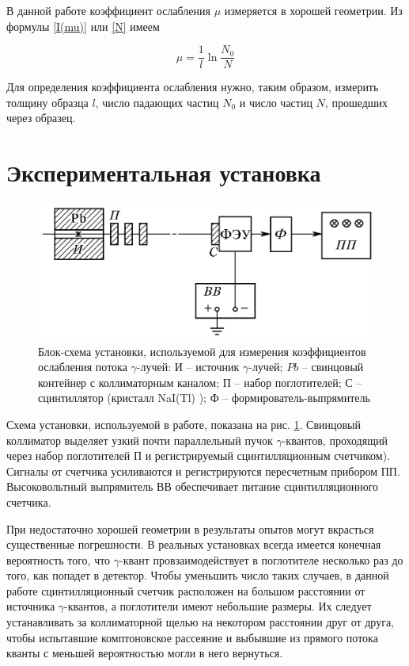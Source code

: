 \documentclass[a4paper, 12pt]{article}%
\begin{document}
	В данной работе коэффициент ослабления $ \mu $ измеряется в хорошей
	геометрии. Из формулы \eqref{I(mu)} или \eqref{N} имеем
	
	\begin{equation}\label{mu}
	\mu = \dfrac{1}{l} \ln{\dfrac{N_0}{N}}
	\end{equation}
	
	Для определения коэффициента ослабления нужно, таким образом, измерить толщину образца $ l $, число падающих частиц $ N_0 $ и число
	частиц $ N $, прошедших через образец.
	
	\section{Экспериментальная установка}
	
		\begin{figure}[h!]
		\centering
		\includegraphics[width=0.7\linewidth]{images/lab.png}
		\caption{Блок-схема установки, используемой для измерения коэффициентов ослабления потока $\gamma$-лучей: И -- источник $\gamma$-лучей; $ Pb $ -- свинцовый контейнер с коллиматорным каналом; П -- набор поглотителей; С -- сцинтиллятор (кристалл NaI(Tl) ); Ф -- формирователь-выпрямитель}
		\label{ris lab}
	\end{figure}

Схема установки, используемой в работе, показана на рис. \ref{ris lab}. Свинцовый коллиматор выделяет узкий почти параллельный пучок $\gamma$-квантов, проходящий через набор поглотителей П и регистрируемый сцинтилляционным счетчиком). Сигналы от счетчика усиливаются и регистрируются пересчетным прибором ПП. Высоковольтный выпрямитель ВВ обеспечивает питание сцинтилляционного счетчика.

При недостаточно хорошей геометрии в результаты опытов могут
вкрасться существенные погрешности. В реальных установках всегда имеется конечная вероятность того, что $\gamma$-квант провзаимодействует в
поглотителе несколько раз до того, как попадет в детектор. Чтобы уменьшить число таких случаев, в данной работе сцинтилляционный счетчик расположен на большом расстоянии от источника $\gamma$-квантов, а поглотители имеют небольшие
размеры. Их следует устанавливать за коллиматорной щелью на некотором расстоянии друг от друга, чтобы испытавшие комптоновское
рассеяние и выбывшие из прямого потока кванты с меньшей вероятностью могли в него вернуться.
\end{document}
